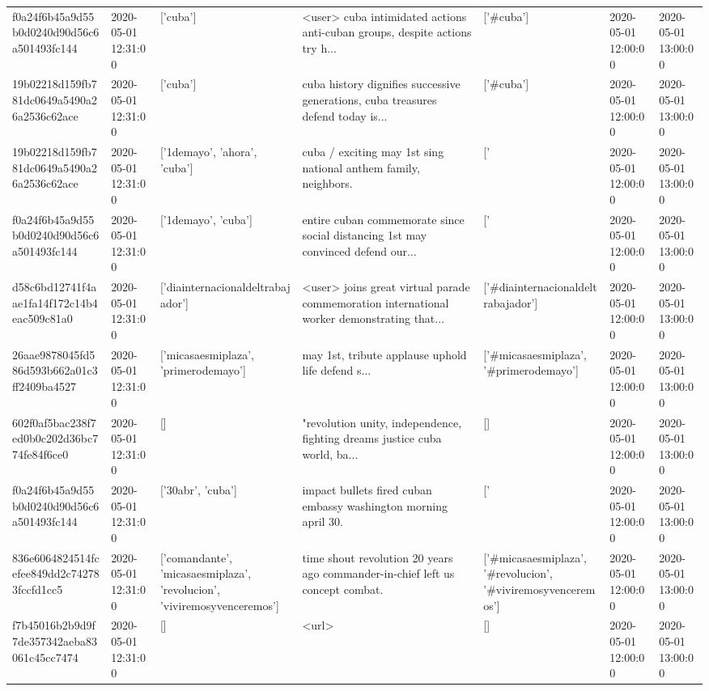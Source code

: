 \begin{tabular}{lllllll}
f0a24f6b45a9d55b0d0240d90d56c6a501493fc144 & 2020-05-01 12:31:00 & ['cuba'] & <user> cuba intimidated actions anti-cuban groups, despite actions try h... & ['#cuba'] & 2020-05-01 12:00:00 & 2020-05-01 13:00:00 \\
19b02218d159fb781dc0649a5490a26a2536c62ace & 2020-05-01 12:31:00 & ['cuba'] & cuba history dignifies successive generations, cuba treasures defend today is... & ['#cuba'] & 2020-05-01 12:00:00 & 2020-05-01 13:00:00 \\
19b02218d159fb781dc0649a5490a26a2536c62ace & 2020-05-01 12:31:00 & ['1demayo', 'ahora', 'cuba'] & cuba / exciting may 1st sing national anthem family, neighbors. & ['#1demayo', '#ahora', '#cuba'] & 2020-05-01 12:00:00 & 2020-05-01 13:00:00 \\
f0a24f6b45a9d55b0d0240d90d56c6a501493fc144 & 2020-05-01 12:31:00 & ['1demayo', 'cuba'] & entire cuban commemorate since social distancing 1st may convinced defend our... & ['#1demayo', '#cuba'] & 2020-05-01 12:00:00 & 2020-05-01 13:00:00 \\
d58c6bd12741f4aae1fa14f172c14b4eac509c81a0 & 2020-05-01 12:31:00 & ['diainternacionaldeltrabajador'] & <user> joins great virtual parade commemoration international worker demonstrating that... & ['#diainternacionaldeltrabajador'] & 2020-05-01 12:00:00 & 2020-05-01 13:00:00 \\
26aae9878045fd586d593b662a01c3ff2409ba4527 & 2020-05-01 12:31:00 & ['micasaesmiplaza', 'primerodemayo'] & may 1st, tribute applause uphold life defend s... & ['#micasaesmiplaza', '#primerodemayo'] & 2020-05-01 12:00:00 & 2020-05-01 13:00:00 \\
602f0af5bac238f7ed0b0c202d36bc774fe84f6ce0 & 2020-05-01 12:31:00 & [] & "revolution unity, independence, fighting dreams justice cuba world, ba... & [] & 2020-05-01 12:00:00 & 2020-05-01 13:00:00 \\
f0a24f6b45a9d55b0d0240d90d56c6a501493fc144 & 2020-05-01 12:31:00 & ['30abr', 'cuba'] & impact bullets fired cuban embassy washington morning april 30. & ['#30abr', '#cuba'] & 2020-05-01 12:00:00 & 2020-05-01 13:00:00 \\
836e6064824514fcefee849dd2c742783fccfd1cc5 & 2020-05-01 12:31:00 & ['comandante', 'micasaesmiplaza', 'revolucion', 'viviremosyvenceremos'] & time shout revolution 20 years ago commander-in-chief left us concept combat. & ['#micasaesmiplaza', '#revolucion', '#viviremosyvenceremos'] & 2020-05-01 12:00:00 & 2020-05-01 13:00:00 \\
f7b45016b2b9d9f7de357342aeba83061c45cc7474 & 2020-05-01 12:31:00 & [] & <url> & [] & 2020-05-01 12:00:00 & 2020-05-01 13:00:00 \\

\end{tabular}
